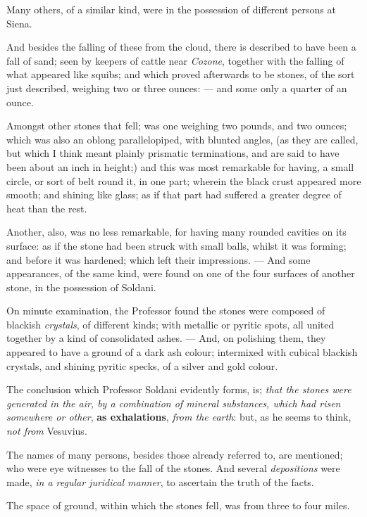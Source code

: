 \documentclass[a4paper, 12pt, oneside]{article}
\begin{document}
Many others, of a similar kind, were in the possession of different persons at Siena.

And besides the falling of these from the cloud, there is described to have been a fall of sand; seen by keepers of cattle near \emph{Cozone}, together with the falling of what appeared like squibs; and which proved afterwards to be stones, of the sort just described, weighing two or three ounces: --- and some only a quarter of an ounce.

Amongst other stones that fell; was one weighing two pounds, and two ounces; which was also an oblong parallelopiped, with blunted angles, (as they are called, but which I think meant plainly prismatic terminations, and are said to have been about an inch in height;) and this was most remarkable for having, a small circle, or sort of belt round it, in one part; wherein the black crust appeared more smooth; and shining like glass; as if that part had suffered a greater degree of heat than the rest.

Another, also, was no less remarkable, for having many rounded cavities on its surface: as if the stone had been struck with small balls, whilst it was forming; and before it was hardened; which left their impressions. --- And some appearances, of the same kind, were found on one of the four surfaces of another stone, in the possession of Soldani.

On minute examination, the Professor found the stones were composed of blackish \emph{crystals}, of different kinds; with metallic or pyritic spots, all united together by a kind of consolidated ashes. --- And, on polishing them, they appeared to have a ground of a dark ash colour; intermixed with cubical blackish crystals, and shining pyritic specks, of a silver and gold colour.

The conclusion which Professor Soldani evidently forms, is; \emph{that the stones were generated in the air, by a combination of mineral substances, which had risen somewhere or other}, \textbf{as exhalations}, \emph{from the earth}: but, as he seems to think, \emph{not from} Vesuvius.

The names of many persons, besides those already referred to, are mentioned; who were eye witnesses to the fall of the stones. And several \emph{depositions} were made, \emph{in a regular juridical manner}, to ascertain the truth of the facts.

The space of ground, within which the stones fell, was from three to four miles.
\end{document}
